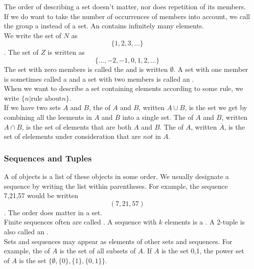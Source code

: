 \documentclass{article}
\begin{document}
The order of describing a set doesn't matter, nor does repetition of its members. If we do want to take the number of occurrences of members into account, we call the group a  instead of a set. An  contains infinitely many elements. \\ 

We write the set of  $N$ as $$\{1,2,3,\dots\}$$. The set of  $Z$ is written as $$\{\dots,-2,-1,0,1,2,\dots\}$$ The set with zero members is called the  and is written $\emptyset$. A set with one member is sometimes called a  and a set with two members is called an . \\ 

When we want to describe a set containing elements according to some rule, we write $\{n \vert \textrm{rule about} n\}$. \\ 

If we have two sets $A$ and $B$, the  of $A$ and $B$, written $A \cup B$, is the set we get by combining all the leements in $A$ and $B$ into a single set. The  of $A$ and $B$, written $A \cap B$, is the set of elements that are both $A$ and $B$. The  of $A$, written $\overline{A}$, is the set of elelements under consideration that are $not$ in $A$. \\ 

\subsubsection{Sequences and Tuples}

A  of objects is a list of these objects in some order. We usually designate a sequence by writing the list within parentheses. For example, the sequence 7,21,57 would be written $$(7,21,57)$$. The order does matter in a set. \\ 

Finite sequences often are called . A sequence with $k$ elements is a . A 2-tuple is also called an . \\ 

Sets and sequences may appear as elements of other sets and sequences. For example, the  of $A$ is the set of all subsets of $A$. If $A$ is the set {0,1}, the power set of $A$ is the set $\{\emptyset, \{0\}, \{1\}, \{0,1\}\}$. \\ 
\end{document}
